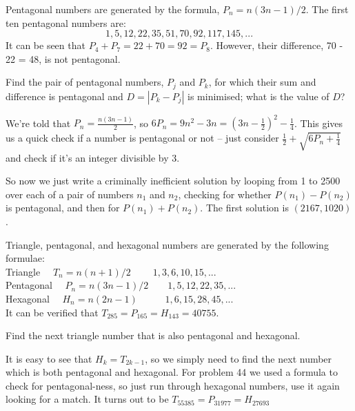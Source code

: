 \vspace{-0.5cm}



Pentagonal numbers are generated by the formula, $P_n=n(3n-1)/2$. The first ten pentagonal numbers are:
$$ 1, 5, 12, 22, 35, 51, 70, 92, 117, 145, ...$$
It can be seen that $P_4 + P_7 = 22 + 70 = 92 = P_8$. However, their difference, 70 - 22 = 48, is not pentagonal.

Find the pair of pentagonal numbers, $P_j$ and $P_k$, for which their sum and difference is pentagonal and $D = |P_k - P_j|$ is minimised; what is the value of $D$?

We're told that $P_n = \tfrac{n(3n-1)}2$, so $6P_n = 9n^2-3n = (3n-\tfrac 12)^2-\tfrac 14$.  This gives
us a quick check if a number is pentagonal or not -- just consider $\tfrac 12 + \sqrt{6P_n+\tfrac 14}$ and
check if it's an integer divisible by 3.

So now we just write a criminally inefficient solution by looping from 1 to 2500 over each of a pair
of numbers $n_1$ and $n_2$, checking for whether $P(n_1)-P(n_2)$ is pentagonal, and then for $P(n_1)+P(n_2)$.
The first solution is $(2167, 1020)$.




Triangle, pentagonal, and hexagonal numbers are generated by the following formulae:  \\
Triangle\phantom{aln }    $\quad T_n=n(n+1)/2   \qquad\;    1, 3, 6, 10, 15, ...         $   \\
Pentagonal 	$\quad   P_n=n(3n-1)/2        \qquad	  	1, 5, 12, 22, 35, ...   $     \\
Hexagonal\phantom{ } 	$\quad   H_n=n(2n-1) 	  \qquad\;\;\; 	1, 6, 15, 28, 45, ...   $        \\

It can be verified that $T_{285} = P_{165} = H_{143} = 40755$.

Find the next triangle number that is also pentagonal and hexagonal.

It is easy to see that $H_k = T_{2k-1}$, so we simply need to find the next number which
is both pentagonal and hexagonal.  For problem 44 we used a formula to check
for pentagonal-ness, so just run through hexagonal numbers, use it again looking for a match.
It turns out to be $T_{55385} = P_{31977} = H_{27693}$

